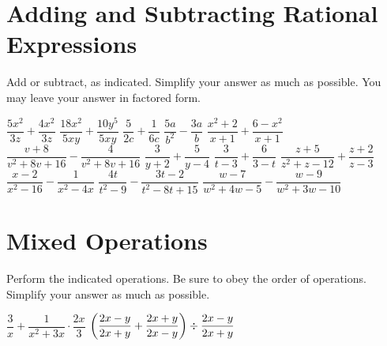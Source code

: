 \section*{Adding and Subtracting Rational Expressions}
Add or subtract, as indicated.  Simplify your answer as much as possible.  You may leave your answer in factored form.
\begin{smenum}
\mitemxxx
{$\dfrac{5x^2}{3z}+\dfrac{4x^2}{3z}$}
{$\dfrac{18x^2}{5xy}+\dfrac{10y^5}{5xy}$}
{$\dfrac{5}{2c}+\dfrac{1}{6c}$}
\mitemxxx
{$\dfrac{5a}{b^2}-\dfrac{3a}{b}$}
{$\dfrac{x^2+2}{x+1}+\dfrac{6-x^2}{x+1}$}
{$\dfrac{v+8}{v^2+8v+16}-\dfrac{4}{v^2+8v+16}$}
\mitemxxx
{$\dfrac{3}{y+2}+\dfrac{5}{y-4}$}
{$\dfrac{3}{t-3}+\dfrac{6}{3-t}$}
{$\dfrac{z+5}{z^2+z-12}+\dfrac{z+2}{z-3}$}
\mitemxxx
{$\dfrac{x-2}{x^2-16}-\dfrac{1}{x^2-4x}$}
{$\dfrac{4t}{t^2-9}-\dfrac{3t-2}{t^2-8t+15}$}
{$\dfrac{w-7}{w^2+4w-5}-\dfrac{w-9}{w^2+3w-10}$}
\end{smenum}

\section*{Mixed Operations}
Perform the indicated operations.  Be sure to obey the order of operations.  Simplify your answer as much as possible.
\begin{smenum}
\mitemxx
{$\dfrac{3}{x}+\dfrac{1}{x^2+3x}\cdot\dfrac{2x}{3}$}
{$\left(\dfrac{2x-y}{2x+y}+\dfrac{2x+y}{2x-y}\right)\div\dfrac{2x-y}{2x+y}$}
\end{smenum}


